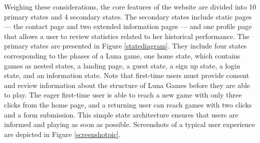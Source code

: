 Weighing these considerations, the core features of the website are divided into 10 primary states and 4 secondary states. The secondary states include static pages --- the contact page and two extended information pages --- and one profile page that allows a user to review statistics related to her historical performance. The primary states are presented in Figure \ref{statediagram}. They include four states corresponding to the phases of a Luna game, one home state, which contains games as nested states, a landing page, a guest state, a sign up state, a login state, and an information state. Note that first-time users must provide consent and review information about the structure of Luna Games before they are able to play. The eager first-time user is able to reach a new game with only three clicks from the home page, and a returning user can reach games with two clicks and a form submission. This simple state architecture ensures that users are informed and playing as soon as possible. Screenshots of a typical user experience are depicted in Figure \ref{screenshotpic}.

